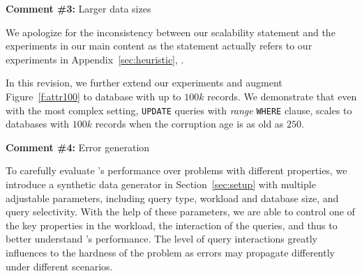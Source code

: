 \comskip

\noindent
\textbf{Comment \#3:} Larger data sizes
\begin{quote}
\end{quote}

We apologize for the inconsistency between our scalability statement and the experiments 
in our main content as the statement actually refers to our experiments in Appendix~\ref{sec:heuristic}, . 

In this revision, we further extend our experiments and augment
Figure~\ref{f:attr100} to database with up to $100k$ records. 
We demonstrate that even with the most complex
setting, \texttt{UPDATE} queries with \textit{range} \texttt{WHERE} clause,
\sys scales to databases with $100k$ records when the corruption age is as old
as $250$.



\comskip

\noindent
\textbf{Comment \#4:} Error generation
\begin{quote}
\end{quote}


To carefully evaluate \sys's performance over problems with different
properties, we introduce a synthetic data generator in Section~\ref{sec:setup}
with multiple adjustable parameters, including query type, workload and
database size, and query selectivity. With the help of these parameters, we
are able to control one of the key properties in the workload, the interaction
of the queries, and thus to better understand \sys's performance. The level of
query interactions greatly influences to the hardness of the problem as errors
may propagate differently under different scenarios.

